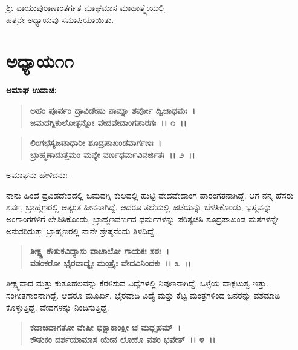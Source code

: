 \begin{center}
ಶ‍್ರೀ ವಾಯುಪುರಾಣಾಂತರ್ಗತ ಮಾಘಮಾಸ ಮಾಹಾತ್ಮ್ಯೇಯಲ್ಲಿ \\ ಹತ್ತನೇ ಅಧ್ಯಾಯವು ಸಮಾಪ್ತಿಯಾಯಿತು.
\end{center}

\newpage

\section*{ಅಧ್ಯಾಯ\enginline{-}೧೧}

\emptypage

\begin{flushleft}
\textbf{ಅಮಾಘ ಉವಾಚ:\enginline{-} }
\end{flushleft}

\begin{verse}
\textbf{ಅಹಂ ಪೂರ್ವಂ ದ್ರಾವಿಡೇಷು ನಾಮ್ನಾ ಶರ್ವೋ ದ್ವಿಜಾಧಮಃ~।}\\\textbf{ಜಮದಗ್ನಿಕುಲೋತ್ಪನ್ನೋ ವೇದವೇದಾಂಗಪಾರಗಃ~।। ೧~।।} 
\end{verse}

\begin{verse}
\textbf{ಲಿಂಗಭಸ್ಯಜಟಾಧಾರೀ ಶೂದ್ರಪಾಖಂಡವಾರ್ಗಣಃ~।}\\\textbf{ಬ್ರಾಹ್ಮಣಾದುತ್ತಮಂ ಮನ್ಯೇ ವರ್ಣಧರ್ಮವಿವರ್ಜಿತಃ~।। ೨~।।}
\end{verse}

\begin{flushleft}
ಅಮಾಘನು ಹೇಳಿದನು:-
\end{flushleft}

ನಾನು ಹಿಂದೆ ದ್ರವಿಡದೇಶದಲ್ಲಿ ಜಮದಗ್ನಿ ಕುಲದಲ್ಲಿ ಹುಟ್ಟಿ ವೇದವೇದಾಂಗ ಪಾರಂಗತನಾಗಿದ್ದೆ. ಆಗ ನನ್ನ ಹೆಸರು ಶರ್ವ, ಬ್ರಾಹ್ಮಣರಲ್ಲಿ ಅತ್ಯಂತ ಹೀನನಾಗಿದ್ದೆ. ಆದರೂ ತಲೆಯಲ್ಲಿ ಜಟೆಯನ್ನು ಬೆಳಸಿಕೊಂಡು, ಭಸ್ಮವನ್ನು ಅಂಗಾಂಗಗಳಿಗೆ ಲೇಪಿಸಿಕೊಂಡು, ಬ್ರಾಹ್ಮಣವರ್ಣದ ಧರ್ಮಗಳನ್ನು ಪರಿತ್ಯಜಿಸಿ ಶೂದ್ರಪಾಖಂಡ ಮತಗಳನ್ನೇ ಅನುಸರಿಸುತ್ತಾ ಬ್ರಾಹ್ಮಣರಲ್ಲಿ ನಾನೇ ಶ್ರೇಷ್ಠನೆಂದು ತಿಳಿದಿದ್ದೆ.

\begin{verse}
\textbf{ತೀಕ್ಷ್ಣ ಕೌತುಕವಿದ್ಯಾಸು ವಾಚಾಲೋ ಗಾಯಕಃ ಶಠಃ~।}\\\textbf{ವಶಂಕರೋ ಭೈರವಾದ್ಯೈಃ ಮಂತ್ರೈಃ ವೇದವಿನಿಂದಕಃ~।। ೩~।।}
\end{verse}

ತೀಕ್ಷ್ಮವಾದ ಮತ್ತು ಕುತೂಹಲವನ್ನು ಕೆರಳಿಸುವ ವಿದ್ಯೆಗಳಲ್ಲಿ ನಿಪುಣನಾಗಿದ್ದೆ. ಒಳ್ಳೆಯ ವಾಕ್ಪಟುತ್ವ ಇತ್ತು. ಸಂಗೀತಗಾರನಾಗಿದ್ದೆ. ಆದರೂ ಮೂರ್ಖ, ಭೈರವಾದಿ ವಿದ್ಯೆ ಮತ್ತು ಕೆಟ್ಟ ಮಂತ್ರಗಳಿಂದ ಜನರನ್ನು ವಶಮಾಡಿ ಕೊಳ್ಳುತ್ತಿದ್ದೆ. ವೇದಗಳನ್ನು ನಿಂದಿಸುತ್ತಿದ್ದೆ.

\begin{verse}
\textbf{ಕದಾಚಿದಾಗತೋ ವೇಷೀ ಭಿಕ್ಷಾಕಾಂಕ್ಷೀ ಚ ಮದ್ಗೃಹಮ್~।}\\\textbf{ಕೌತುಕಂ ದರ್ಶಯಾಮಾಸ ಯೇನ ಲೋಕೊ ವಶಂ ಭವೇತ್~।। ೪~।।}
\end{verse}

